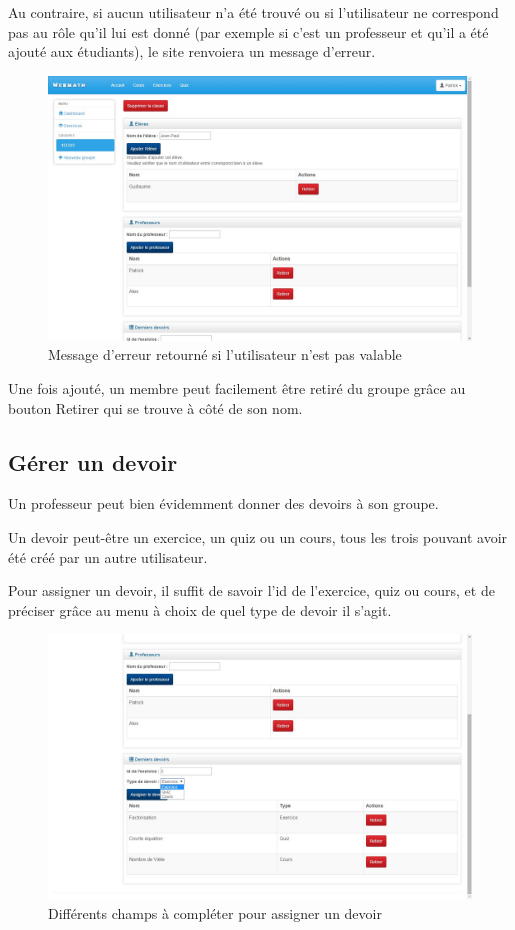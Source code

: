 \documentclass[letterpaper,10pt,french]{sphinxmanual}
\begin{document}
Au contraire, si aucun utilisateur n'a été trouvé ou si l'utilisateur ne
correspond pas au rôle qu'il lui est donné (par exemple si c'est un
professeur et qu'il a été ajouté aux étudiants), le site renvoiera un message
d'erreur.
\begin{figure}[htbp]
\centering
\capstart

\includegraphics[width=0.700\linewidth]{classAjouterMembresEchec.jpg}
\caption{Message d'erreur retourné si l'utilisateur n'est pas valable}\end{figure}

Une fois ajouté, un membre peut facilement être retiré du groupe grâce au bouton
Retirer qui se trouve à côté de son nom.


\subsection{Gérer un devoir}
\label{dashboard:gerer-un-devoir}
Un professeur peut bien évidemment donner des devoirs à son groupe.

Un devoir peut-être un exercice, un quiz ou un cours, tous les trois
pouvant avoir été créé par un autre utilisateur.

Pour assigner un devoir, il suffit de savoir l'id de l'exercice, quiz ou cours,
et de préciser grâce au menu à choix de quel type de devoir il s'agit.
\begin{figure}[htbp]
\centering
\capstart

\includegraphics[width=0.700\linewidth]{classDevoir.jpg}
\caption{Différents champs à compléter pour assigner un devoir}\end{figure}
\end{document}
